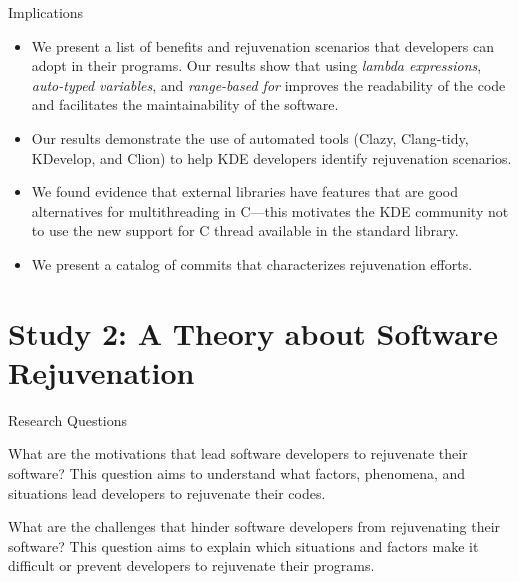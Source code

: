 \documentclass[newPxFont,numfooter,sectionpages]{beamer}
\newcommand{\Rplus}{\protect\hspace{-.1em}\protect\raisebox{.35ex}{\small\textbf{+}}}
\newcommand{\cc}{\mbox{C\Rplus\Rplus}\xspace}
\newcommand{\lambdaExp}{\emph{lambda expressions}\xspace}
\newcommand{\autoDecl}{\emph{auto-typed variables}\xspace}
\newcommand{\rangeFor}{\emph{range-based for}\xspace}
\begin{document}
\begin{frame}{Implications}

{\footnotesize
\begin{itemize}
\item We present a list of benefits and rejuvenation scenarios that developers can adopt in their programs. Our results show that using \lambdaExp, \autoDecl, and \rangeFor improves the readability of the code and facilitates the maintainability of the software. 

\item Our results demonstrate the use of automated tools (Clazy, Clang-tidy, KDevelop, and Clion) to help KDE developers identify rejuvenation scenarios.

\item We found evidence that external libraries have features that are good alternatives for multithreading in \cc---this motivates the KDE community not to use the new support for \cc thread available in the standard library. 

\item We present a catalog of commits that characterizes rejuvenation efforts.
\end{itemize}
}

\end{frame}
\endgroup




\section{Study 2: A Theory about Software Rejuvenation}

\begingroup
{}
\begin{frame}[c]{Research Questions}

\begin{block}{What are the motivations that lead software developers to rejuvenate their software?}
{\color{white} This question aims to understand what factors, phenomena, and situations lead developers to rejuvenate their codes.}
\end{block}

\begin{block}{What are the challenges that hinder software developers from rejuvenating their software?}
{\color{white} This question aims to explain which situations and factors make it difficult or prevent developers to rejuvenate their programs.}
\end{block}

\end{frame}
\end{document}
